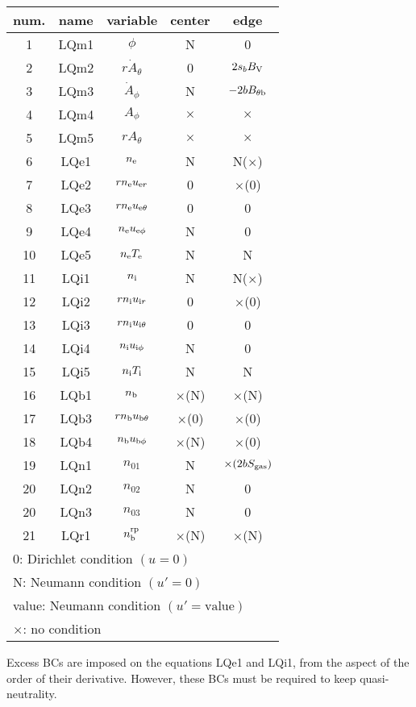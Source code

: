 \documentclass[11pt]{article}
\def\r#1{{\rm#1}}
\def\nee{n_\r{e}}
\def\ni{n_\r{i}}
\def\nb{n_\r{b}}
\def\uer{u_{\r{e}r}}
\def\uir{u_{\r{i}r}}
\def\ueth{u_{\r{e}\theta}}
\def\uith{u_{\r{i}\theta}}
\def\ubth{u_{\r{b}\theta}}
\def\ueph{u_{\r{e}\phi}}
\def\uiph{u_{\r{i}\phi}}
\def\ubph{u_{\r{b}\phi}}
\def\Athd{\dot{A}_\theta}
\def\Aphd{\dot{A}_\phi}
\def\Ath{A_\theta}
\def\Aph{A_\phi}
\def\Te{T_\r{e}}
\def\Ti{T_\r{i}}
\def\nna{n_{01}}
\def\nnb{n_{02}}
\def\nnc{n_{03}}
\def\nbrp{n_\r{b}^\r{rp}}
\begin{document}
\begin{tabular}{|c|c|c|c|c|}\hline
 num. & name & variable       & center & edge \\\hline
 1    & LQm1 & $\phi$         & N        & 0\\
 2    & LQm2 & $r \Athd$      & 0        & $2s_b B_\r{V}$\\
 3    & LQm3 & $\Aphd$        & N        & $-2bB_{\theta\r{b}}$\\
 4    & LQm4 & $\Aph$         & $\times$ & $\times$\\
 5    & LQm5 & $r \Ath$       & $\times$ & $\times$\\
 6    & LQe1 & $\nee$         & N        & N($\times$)\\
 7    & LQe2 & $r \nee \uer$  & 0        & $\times$(0)\\
 8    & LQe3 & $r \nee \ueth$ & 0        & 0\\
 9    & LQe4 & $\nee \ueph$   & N        & 0\\
 10   & LQe5 & $\nee \Te$     & N        & N\\
 11   & LQi1 & $\ni$          & N        & N($\times$)\\
 12   & LQi2 & $r \ni \uir$   & 0        & $\times$(0)\\
 13   & LQi3 & $r \ni \uith$  & 0        & 0\\
 14   & LQi4 & $\ni \uiph$    & N        & 0\\
 15   & LQi5 & $\ni \Ti$      & N        & N\\
 16   & LQb1 & $\nb$          & $\times$(N) & $\times$(N)\\
 17   & LQb3 & $r \nb \ubth$  & $\times$(0) & $\times$(0)\\
 18   & LQb4 & $\nb \ubph$    & $\times$(N) & $\times$(0)\\
 19   & LQn1 & $\nna$         & N        & $\times(2bS_\r{gas})$\\
 20   & LQn2 & $\nnb$         & N        & 0\\
 20   & LQn3 & $\nnc$         & N        & 0\\
 21   & LQr1 & $\nbrp$        & $\times$(N) & $\times$(N)\\\hline
 \multicolumn{5}{l}{0: Dirichlet condition $(u=0)$}\\
 \multicolumn{5}{l}{N: Neumann condition $(u'=0)$}\\
 \multicolumn{5}{l}{value: Neumann condition $(u'=\mbox{value})$}\\
 \multicolumn{5}{l}{$\times$: no condition}
\end{tabular}

\medskip

Excess BCs are imposed on the equations LQe1 and LQi1, from the aspect
of the order of their derivative. However, these BCs must be required to
keep quasi-neutrality.
\end{document}
